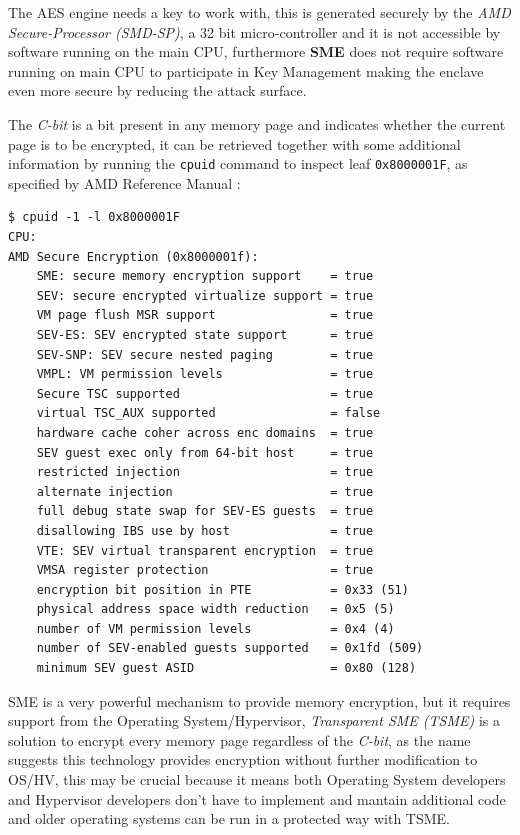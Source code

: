 \documentclass[twocolumn]{article}
\begin{document}
The AES engine needs a key to work with, this is generated securely by the \textit{AMD Secure-Processor (SMD-SP)}, a 32 bit micro-controller and it is not accessible by software running on the main CPU, furthermore \textbf{SME} does not require software running on main CPU to participate in Key Management making the enclave even more secure by reducing the attack surface.

The \textit{C-bit} is a bit present in any memory page and indicates whether the current page is to be encrypted, it can be retrieved together with some additional information by running the \texttt{cpuid} command to inspect leaf \texttt{0x8000001F}, as specified by AMD Reference Manual \cite{architecture-reference}:

\begin{verbatim}
$ cpuid -1 -l 0x8000001F
CPU:
AMD Secure Encryption (0x8000001f):
    SME: secure memory encryption support    = true
    SEV: secure encrypted virtualize support = true
    VM page flush MSR support                = true
    SEV-ES: SEV encrypted state support      = true
    SEV-SNP: SEV secure nested paging        = true
    VMPL: VM permission levels               = true
    Secure TSC supported                     = true
    virtual TSC_AUX supported                = false
    hardware cache coher across enc domains  = true
    SEV guest exec only from 64-bit host     = true
    restricted injection                     = true
    alternate injection                      = true
    full debug state swap for SEV-ES guests  = true
    disallowing IBS use by host              = true
    VTE: SEV virtual transparent encryption  = true
    VMSA register protection                 = true
    encryption bit position in PTE           = 0x33 (51)
    physical address space width reduction   = 0x5 (5)    
    number of VM permission levels           = 0x4 (4)
    number of SEV-enabled guests supported   = 0x1fd (509)
    minimum SEV guest ASID                   = 0x80 (128)
\end{verbatim}
    
SME is a very powerful mechanism to provide memory encryption, but it requires support from the Operating System/Hypervisor, \textit{Transparent SME (TSME)} is a solution to encrypt every memory page regardless of the \textit{C-bit}, as the name suggests this technology provides encryption without further modification to OS/HV, this may be crucial because it means both Operating System developers and Hypervisor developers don't have to implement and mantain additional code and older operating systems can be run in a protected way with TSME.
\end{document}
